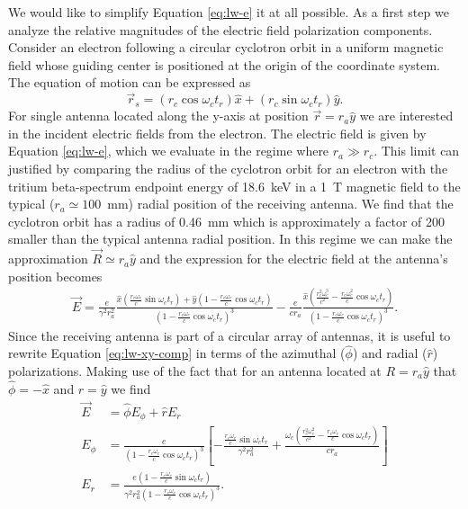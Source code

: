We would like to simplify Equation \ref{eq:lw-e} it at all possible. As a first step we analyze the relative magnitudes of the electric field polarization components. Consider an electron following a circular cyclotron orbit in a uniform magnetic field whose guiding center is positioned at the origin of the coordinate system. The equation of motion can be expressed as 
\begin{equation}
    \vec r_s= (r_c\cos{\omega_ct_{r}})\hat x+(r_c\sin{\omega_ct_{r}})\hat y.
\end{equation}
For single antenna located along the y-axis at position $\vec{r}=r_{a}\hat{y}$ we are interested in the incident electric fields from the electron. The electric field is given by Equation \ref{eq:lw-e}, which we evaluate in the regime where $r_{a}\gg r_c$. This limit can justified by comparing the radius of the cyclotron orbit for an electron with the tritium beta-spectrum endpoint energy of 18.6~keV in a 1~T magnetic field to the typical ($r_{a}\simeq100$~mm) radial position of the receiving antenna. We find that the cyclotron orbit has a radius of 0.46~mm which is approximately a factor of 200 smaller than the typical antenna radial position. In this regime we can make the approximation $\vec{R}\simeq r_{a}\hat{y}$ and the expression for the electric field at the antenna's position becomes
\begin{multline}
    \label{eq:lw-xy-comp}
    \vec{E}=\frac{e}{\gamma^2r_{a}^2}\frac{\hat{x}(\frac{r_c\omega_c}{c}\sin{\omega_ct_{r}})+\hat{y}(1-\frac{r_c\omega_c}{c}\cos{\omega_ct_{r}})}{(1-\frac{r_c\omega_c}{c}\cos{\omega_ct_{r}})^3}
    - \frac{e}{cr_{a}}\frac{\hat{x}(\frac{r_c^2\omega_c^3}{c^2}-\frac{r_c\omega_c^2}{c}\cos{\omega_ct_{r}})}{(1-\frac{r_c\omega_c}{c}\cos{\omega_ct_{r}})^3}.
\end{multline}
Since the receiving antenna is part of a circular array of antennas, it is useful to rewrite Equation \ref{eq:lw-xy-comp} in terms of the azimuthal ($\hat{\phi}$) and radial ($\hat{r}$) polarizations. Making use of the fact that for an antenna located at $R=r_{a}\hat{y}$ that $\hat{\phi}=-\hat{x}$ and $\hat{r}=\hat{y}$ we find
\begin{align}
    \vec{E}&=\hat{\phi}E_\phi+\hat{r}E_r\\
    \label{eq:e-field-azimuthal-comp}
    E_\phi&=\frac{e}{(1-\frac{r_c\omega_c}{c}\cos{\omega_ct_{r}})^3}\left[-\frac{\frac{r_c\omega_c}{c}\sin{\omega_ct_{r}}}{\gamma^2r_{a}^2}+\frac{\omega_c\left(\frac{r_c^2\omega_c^2}{c^2}-\frac{r_c\omega_c}{c}\cos{\omega_ct_{r}}\right)}{cr_{a}}\right]\\
    E_r&=\frac{e(1-\frac{r_c\omega_c}{c}\sin{\omega_ct_{r}})}{\gamma^2r_{a}^2(1-\frac{r_c\omega_c}{c}\cos{\omega_ct_{r}})^3}.
\end{align}

